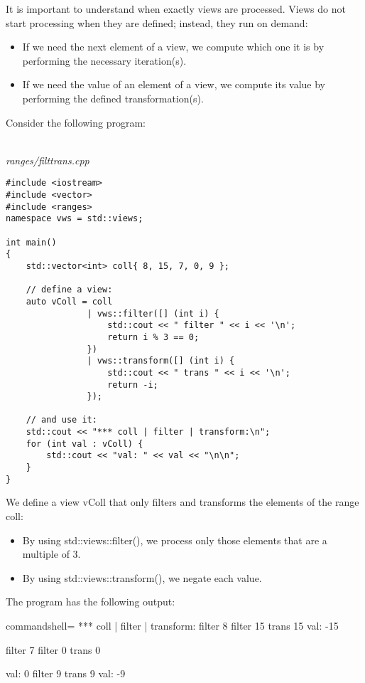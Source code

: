 It is important to understand when exactly views are processed. Views do not start processing when they are defined; instead, they run on demand:

\begin{itemize}
\item
If we need the next element of a view, we compute which one it is by performing the necessary iteration(s).

\item
If we need the value of an element of a view, we compute its value by performing the defined transformation(s).
\end{itemize}

Consider the following program:

\noindent
\hspace*{\fill} \\ %
\textit{ranges/filttrans.cpp}

\begin{lstlisting}[style=styleCXX]
#include <iostream>
#include <vector>
#include <ranges>
namespace vws = std::views;

int main()
{
	std::vector<int> coll{ 8, 15, 7, 0, 9 };
	
	// define a view:
	auto vColl = coll
				| vws::filter([] (int i) {
					std::cout << " filter " << i << '\n';
					return i % 3 == 0;
				})
				| vws::transform([] (int i) {
					std::cout << " trans " << i << '\n';
					return -i;
				});
				
	// and use it:
	std::cout << "*** coll | filter | transform:\n";
	for (int val : vColl) {
		std::cout << "val: " << val << "\n\n";
	}
}
\end{lstlisting}

We define a view vColl that only filters and transforms the elements of the range coll:

\begin{itemize}
\item
By using std::views::filter(), we process only those elements that are a multiple of 3.

\item
By using std::views::transform(), we negate each value.
\end{itemize}

The program has the following output:

{\footnotesize
\begin{tcblisting}{commandshell={}}
*** coll | filter | transform:
filter 8
filter 15
trans 15
val: -15

filter 7
filter 0
trans 0

val: 0
filter 9
trans 9
val: -9
\end{tcblisting}
}

